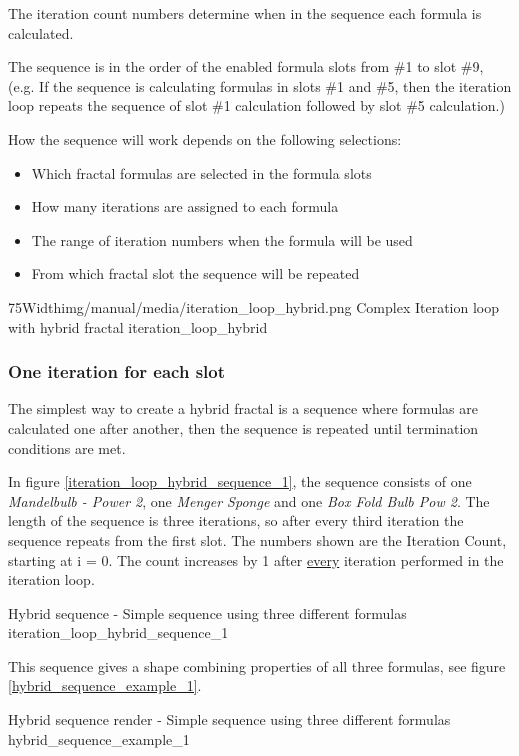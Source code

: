The iteration count numbers determine when in the sequence each formula is calculated.

The sequence is in the order of the enabled formula slots from \#1 to slot \#9, (e.g. If the sequence is calculating formulas in slots
\#1 and \#5, then the iteration loop repeats the sequence of slot \#1 calculation followed by slot
\#5 calculation.)

How the sequence will work depends on the following selections:
\begin{itemize}
	\item Which fractal formulas are selected in the formula slots
	\item How many iterations are assigned to each formula
	\item The range of iteration numbers when the formula will be used
	\item From which fractal slot the sequence will be repeated
\end{itemize}

\simpleImageWithCaption75Width{img/manual/media/iteration_loop_hybrid.png}
{Complex Iteration loop with hybrid fractal}
{iteration_loop_hybrid}

\subsubsection{One iteration for each slot}

The simplest way to create a hybrid fractal is a sequence where formulas are calculated one after another, then the sequence is repeated until termination conditions are met.

In figure \ref{iteration_loop_hybrid_sequence_1}, the sequence consists of one \emph{Mandelbulb - Power 2}, one \emph{Menger Sponge} and
one \emph{Box Fold Bulb Pow 2}. The length of the sequence is three iterations, so after every third iteration the sequence repeats from the first slot. The numbers shown are the Iteration Count, starting at i = 0. The count increases by 1 after \underline{every} iteration performed in the iteration loop.

{Hybrid sequence - Simple sequence using three different formulas}
{iteration_loop_hybrid_sequence_1}

This sequence gives a shape combining properties of all three
formulas, see figure \ref{hybrid_sequence_example_1}.

{Hybrid sequence render - Simple sequence using three different formulas}
{hybrid_sequence_example_1}


